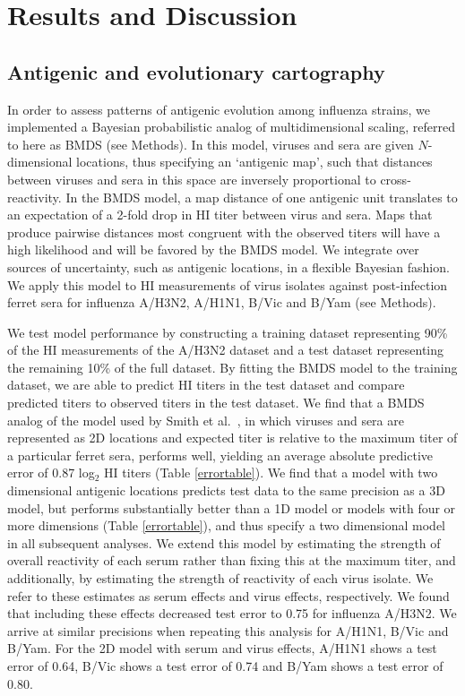 \documentclass[11pt,oneside,letterpaper]{article}
\begin{document}
\section*{Results and Discussion}

\subsection*{Antigenic and evolutionary cartography}

In order to assess patterns of antigenic evolution among influenza strains, we implemented a Bayesian probabilistic analog of multidimensional scaling, referred to here as BMDS (see Methods).
In this model, viruses and sera are given $N$-dimensional locations, thus specifying an `antigenic map', such that distances between viruses and sera in this space are inversely proportional to cross-reactivity.
In the BMDS model, a map distance of one antigenic unit translates to an expectation of a 2-fold drop in HI titer between virus and sera.
Maps that produce pairwise distances most congruent with the observed titers will have a high likelihood and will be favored by the BMDS model.
We integrate over sources of uncertainty, such as antigenic locations, in a flexible Bayesian fashion.
We apply this model to HI measurements of virus isolates against post-infection ferret sera for influenza A/H3N2, A/H1N1, B/Vic and B/Yam (see Methods).

We test model performance by constructing a training dataset representing 90\% of the HI measurements of the A/H3N2 dataset and a test dataset representing the remaining 10\% of the full dataset. 
By fitting the BMDS model to the training dataset, we are able to predict HI titers in the test dataset and compare predicted titers to observed titers in the test dataset. 
We find that a BMDS analog of the model used by Smith et al.\ \cite{Smith04}, in which viruses and sera are represented as 2D locations and expected titer is relative to the maximum titer of a particular ferret sera, performs well, yielding an average absolute predictive error of 0.87 log$_2$ HI titers (Table \ref{errortable}).
We find that a model with two dimensional antigenic locations predicts test data to the same precision as a 3D model, but performs substantially better than a 1D model or models with four or more dimensions (Table \ref{errortable}), and thus specify a two dimensional model in all subsequent analyses.
We extend this model by estimating the strength of overall reactivity of each serum rather than fixing this at the maximum titer, and additionally, by estimating the strength of reactivity of each virus isolate.
We refer to these estimates as serum effects and virus effects, respectively.
We found that including these effects decreased test error to 0.75 for influenza A/H3N2.
We arrive at similar precisions when repeating this analysis for A/H1N1, B/Vic and B/Yam.
For the 2D model with serum and virus effects, A/H1N1 shows a test error of 0.64, B/Vic shows a test error of 0.74 and B/Yam shows a test error of 0.80.
\end{document}
